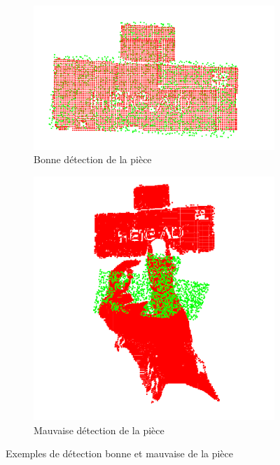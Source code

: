 \begin{figure}[H]
    \centering
    \begin{subfigure}{0.48\textwidth}
        \centering
        \includegraphics[width=0.95\linewidth]{assets/figures/bonne_detec.png}
        \caption{Bonne détection de la pièce}
        \label{fig:bonne_detection_piece}
    \end{subfigure}
    \hfill
    \begin{subfigure}{0.48\textwidth}
        \centering
        \includegraphics[width=0.95\linewidth]{assets/figures/mauvaise_detec.png}
        \caption{Mauvaise détection de la pièce}
        \label{fig:mauvaise_detection_piece}
    \end{subfigure}
    \caption{Exemples de détection bonne et mauvaise de la pièce}
    \label{fig:comparaison_detection_piece}
\end{figure}

